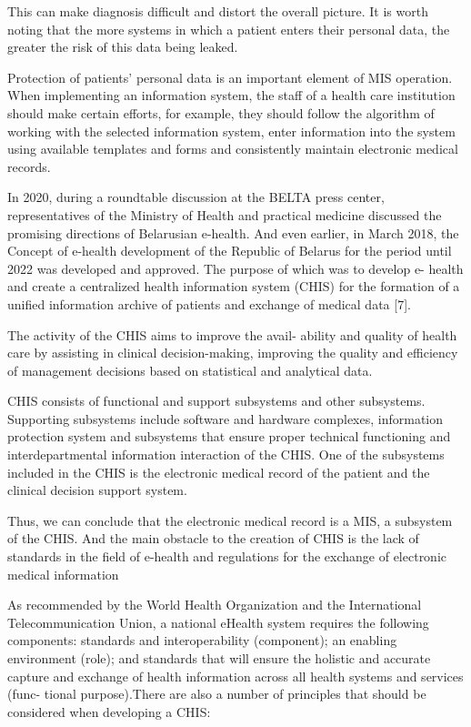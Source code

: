 \documentclass[10pt, a4paper]{article}
\begin{document}
\begin{multicols}{2}
This can make diagnosis difficult and distort the overall
picture. It is worth noting that the more systems in which
a patient enters their personal data, the greater the risk
of this data being leaked.
\par Protection of patients’ personal data is an important
element of MIS operation. When implementing an information system, the staff of a health care institution should
make certain efforts, for example, they should follow
the algorithm of working with the selected information
system, enter information into the system using available
templates and forms and consistently maintain electronic
medical records.
\par In 2020, during a roundtable discussion at the BELTA
press center, representatives of the Ministry of Health
and practical medicine discussed the promising directions of Belarusian e-health. And even earlier, in March
2018, the Concept of e-health development of the Republic of Belarus for the period until 2022 was developed
and approved. The purpose of which was to develop e-
health and create a centralized health information system
(CHIS) for the formation of a unified information archive
of patients and exchange of medical data [7].
\par The activity of the CHIS aims to improve the avail-
ability and quality of health care by assisting in clinical
decision-making, improving the quality and efficiency of
management decisions based on statistical and analytical
data.
\par CHIS consists of functional and support subsystems
and other subsystems. Supporting subsystems include
software and hardware complexes, information protection
system and subsystems that ensure proper technical functioning and interdepartmental information interaction of
the CHIS. One of the subsystems included in the CHIS
is the electronic medical record of the patient and the
clinical decision support system.
\par Thus, we can conclude that the electronic medical
record is a MIS, a subsystem of the CHIS. And the main
obstacle to the creation of CHIS is the lack of standards
in the field of e-health and regulations for the exchange
of electronic medical information
\par As recommended by the World Health Organization
and the International Telecommunication Union, a national eHealth system requires the following components:
standards and interoperability (component); an enabling
environment (role); and standards that will ensure the
holistic and accurate capture and exchange of health
information across all health systems and services (func-
tional purpose).There are also a number of principles that
should be considered when developing a CHIS:


\end{multicols}
\end{document}
